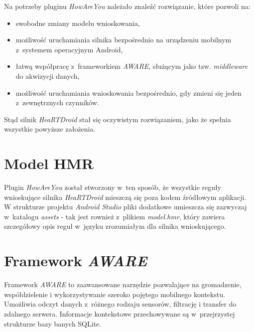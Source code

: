 Na potrzeby pluginu \textit{HowAreYou} należało znaleźć rozwiązanie, które pozwoli na: 
\begin{itemize}
	\item swobodne zmiany modelu wnioskowania,
	
	\item możliwość uruchamiania silnika bezpośrednio na urządzeniu mobilnym z~systemem operacyjnym Android,
	
	\item łatwą współpracę z~frameworkiem \textit{AWARE}, służącym jako tzw. \textit{middleware} do akwizycji danych,
	
	\item możliwość uruchamiania wnioskowania bezpośrednio, gdy zmieni się jeden z~zewnętrznych czynników.
\end{itemize}

Stąd silnik \textit{HeaRTDroid} stał się oczywistym rozwiązaniem, jako że spełnia wszystkie powyższe założenia.


\section{Model HMR}
\label{sec:modelHmr}

Plugin \textit{HowAreYou} został stworzony w~ten sposób, że wszystkie reguły wnioskujące silnika \textit{HeaRTDroid} mieszczą się poza kodem źródłowym aplikacji. W strukturze projektu \textit{Android Studio} pliki dodatkowe umieszcza się zazwyczaj w~katalogu \textit{assets} - tak jest rownież z~plikiem \textit{model.hmr}, który zawiera szczegółowy opis reguł w~języku zrozumiałym dla silnika wnioskującego.


\section{Framework \textit{AWARE}}
\label{sec:frameworkAware}

Framework \textit{AWARE} to zaawansowane narzędzie pozwalające na gromadzenie, współdzielenie i wykorzystywanie szeroko pojętego mobilnego kontekstu. Umożliwia odczyt danych z~różnego rodzaju sensorów, filtrację i transfer do zdalnego serwera. Informacje kontekstowe przechowywane są w~przejrzystej strukturze bazy banych SQLite. 

